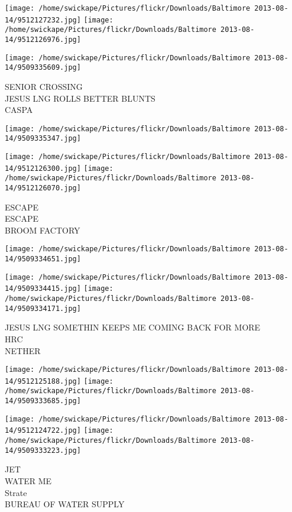 \documentclass[10pt,letterpaper]{article}
\begin{document}
\texttt{[image: /home/swickape/Pictures/flickr/Downloads/Baltimore 2013-08-14/9512127232.jpg]}
\texttt{[image: /home/swickape/Pictures/flickr/Downloads/Baltimore 2013-08-14/9512126976.jpg]}

\texttt{[image: /home/swickape/Pictures/flickr/Downloads/Baltimore 2013-08-14/9509335609.jpg]}

SENIOR CROSSING\\
JESUS LNG ROLLS BETTER BLUNTS\\
CASPA
\pagebreak

\texttt{[image: /home/swickape/Pictures/flickr/Downloads/Baltimore 2013-08-14/9509335347.jpg]}

\vspace{0.25in}
\texttt{[image: /home/swickape/Pictures/flickr/Downloads/Baltimore 2013-08-14/9512126300.jpg]}
\texttt{[image: /home/swickape/Pictures/flickr/Downloads/Baltimore 2013-08-14/9512126070.jpg]}

ESCAPE\\
ESCAPE\\
BROOM FACTORY
\pagebreak

\texttt{[image: /home/swickape/Pictures/flickr/Downloads/Baltimore 2013-08-14/9509334651.jpg]}

\vspace{0.25in}
\texttt{[image: /home/swickape/Pictures/flickr/Downloads/Baltimore 2013-08-14/9509334415.jpg]}
\texttt{[image: /home/swickape/Pictures/flickr/Downloads/Baltimore 2013-08-14/9509334171.jpg]}

JESUS LNG SOMETHIN KEEPS ME COMING BACK FOR MORE\\
HRC\\
NETHER
\pagebreak

\texttt{[image: /home/swickape/Pictures/flickr/Downloads/Baltimore 2013-08-14/9512125188.jpg]}
\texttt{[image: /home/swickape/Pictures/flickr/Downloads/Baltimore 2013-08-14/9509333685.jpg]}

\texttt{[image: /home/swickape/Pictures/flickr/Downloads/Baltimore 2013-08-14/9512124722.jpg]}
\texttt{[image: /home/swickape/Pictures/flickr/Downloads/Baltimore 2013-08-14/9509333223.jpg]}

JET\\
WATER ME\\
Strate\\
BUREAU OF WATER SUPPLY
\pagebreak
\end{document}

